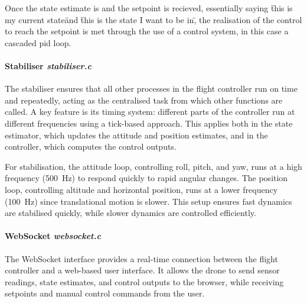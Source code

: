 Once the state estimate is and the setpoint is recieved, essentially saying \"this is my current state\" and \"this is the state I want to be in\", the realisation of the control to reach the setpoint is met through the use of a control system, in this case a cascaded \gls{pid} loop.



\paragraph{\textbf{Stabiliser} \textit{stabiliser.c}} \leavevmode

The stabiliser ensures that all other processes in the flight controller run on time and repeatedly, acting as the centralised task from which other functions are called. A key feature is its timing system: different parts of the controller run at different frequencies using a tick-based approach. This applies both in the state estimator, which updates the attitude and position estimates, and in the controller, which computes the control outputs.  

For stabilisation, the attitude loop, controlling roll, pitch, and yaw, runs at a high frequency (500~Hz) to respond quickly to rapid angular changes. The position loop, controlling altitude and horizontal position, runs at a lower frequency (100~Hz) since translational motion is slower. This setup ensures fast dynamics are stabilised quickly, while slower dynamics are controlled efficiently.


\paragraph{\textbf{WebSocket} \textit{websocket.c}} \leavevmode

The WebSocket interface provides a real-time connection between the flight controller and a web-based user interface. It allows the drone to send sensor readings, state estimates, and control outputs to the browser, while receiving setpoints and manual control commands from the user.  

